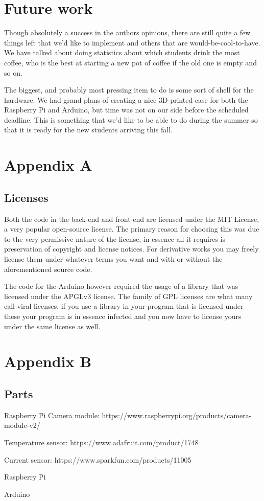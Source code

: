 \documentclass[12pt,a4paper,oneside,article]{memoir}
\numberwithin{equation}{chapter}
\begin{document}
\section{Future work}\label{sec:future-work}
Though absolutely a success in the authors opinions, there are still quite a few
things left that we'd like to implement and others that are
would-be-cool-to-have. We have talked about doing statistics about which
students drink the most coffee, who is the best at starting a new pot of coffee
if the old one is empty and so on.

The biggest, and probably most pressing item to do is some sort of shell for the
hardware. We had grand plans of creating a nice 3D-printed case for both the
Raspberry Pi and Arduino, but time was not on our side before the scheduled
deadline. This is something that we'd like to be able to do during the summer so
that it is ready for the new students arriving this fall.

\clearpage %
\section{Appendix A}\label{sec:appendixA}
\subsection{Licenses}\label{sec:licenses}
Both the code in the back-end and front-end are licensed under the MIT License,
a very popular open-source license. The primary reason for choosing this was due
to the very permissive nature of the license, in essence all it requires is
preservation of copyright and license notices. For derivative works you may
freely license them under whatever terms you want and with or without the
aforementioned source code.

The code for the Arduino however required the usage of a library that was
licensed under the APGLv3 license. The family of GPL licenses are what many call
viral licenses, if you use a library in your program that is licensed under
these your program is in essence infected and you now have to license yours
under the same license as well.


\section{Appendix B}\label{sec:appendixB}
\subsection{Parts}\label{sec:sensors}
Raspberry Pi Camera module: 
https://www.raspberrypi.org/products/camera-module-v2/

Temperature sensor: https://www.adafruit.com/product/1748

Current sensor: https://www.sparkfun.com/products/11005

Raspberry Pi

Arduino

\clearpage{}
\renewcommand*{\UrlFont}{\footnotesize\ttfamily}
\printbibliography{}
\end{document}
